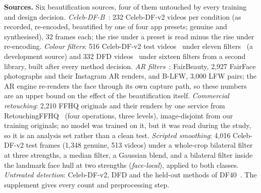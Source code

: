 \documentclass[conference]{IEEEtran}
\begin{document}
\textbf{Sources.} Six beautification sources, four of them untouched by every training and design decision.
\emph{Celeb-DF-B}~\cite{libourel2024}: 232 Celeb-DF-v2 videos per condition (as recorded, re-encoded, beautified by one of
four app presets; genuine and synthesised), 32 frames each; the rise under a preset is read minus the rise under re-encoding.
\emph{Colour filters}: 516 Celeb-DF-v2 test videos~\cite{celebdf} under eleven filters~\cite{pilgram} (a development source)
and 332 DFD videos~\cite{dfd} under sixteen filters from a second library, built after every method decision. \emph{AR
filters}~\cite{openfilter2022}: FairBeauty, 2,927 FairFace photographs and their Instagram AR renders, and B-LFW, 3,000 LFW
pairs; the AR engine re-renders the face through its own capture path, so these numbers are an upper bound on the effect of
the beautification itself. \emph{Commercial retouching}: 2,210 FFHQ originals and their renders by one service from
RetouchingFFHQ~\cite{retouchingffhq} (four operations, three levels), image-disjoint from our training originals; no model was
trained on it, but it was read during the study, so it is an analysis set rather than a clean test. \emph{Scripted smoothing}:
4,016 Celeb-DF-v2 test frames (1,348 genuine, 513 videos) under a whole-crop bilateral filter at three strengths, a median
filter, a Gaussian blend, and a bilateral filter inside the landmark face hull at two strengths (\emph{face-local}), applied
to both classes. \emph{Untreated detection}: Celeb-DF-v2, DFD and the held-out methods of DF40~\cite{df40}. The supplement
gives every count and preprocessing step.



\end{document}
